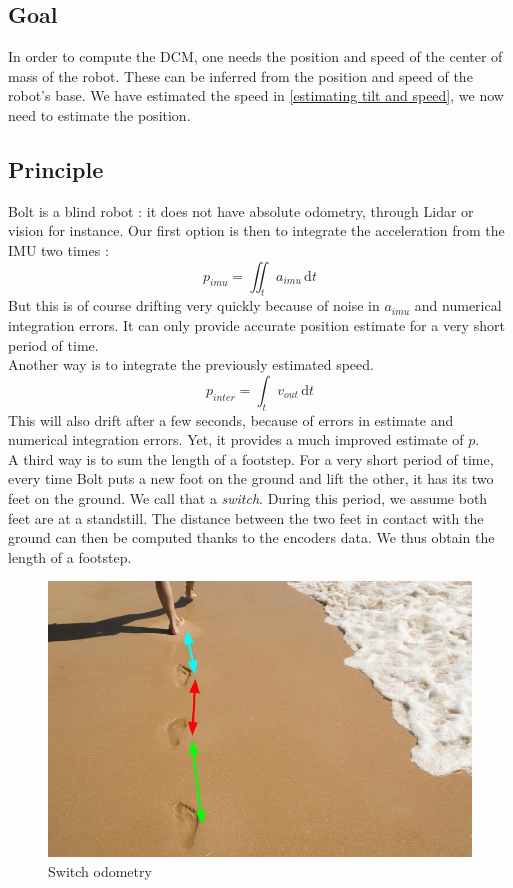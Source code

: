\documentclass[a4paper,10pt]{article}
\begin{document}
\subsection{Goal}
In order to compute the DCM, one needs the position and speed of the center of mass of the robot. These can be inferred from the position and speed of the robot's base. We have estimated the speed in \ref{estimating tilt and speed}, we now need to estimate the position.

\subsection{Principle}
Bolt is a blind robot : it does not have absolute odometry, through Lidar or vision for instance. Our first option is then to integrate the acceleration from the IMU two times :
$$ p_{imu} = \iint_t a_{imu} \, \mathrm{d}t $$
But this is of course drifting very quickly because of noise in $a_{imu}$ and numerical integration errors. It can only provide accurate position estimate for a very short period of time.\\
\newline
Another way is to integrate the previously estimated speed.
$$ p_{inter} = \int_t v_{out} \, \mathrm{d}t $$
This will also drift after a few seconds, because of errors in estimate and numerical integration errors. Yet, it provides a much improved estimate of $p$.\\
\newline
A third way is to sum the length of a footstep. For a very short period of time, every time Bolt puts a new foot on the ground and lift the other, it has its two feet on the ground. We call that a \textit{switch}. During this period, we assume both feet are at a standstill. The distance between the two feet in contact with the ground can then be computed thanks to the encoders data. We thus obtain the length of a footstep.

\begin{figure}[H]
\centering
  \includegraphics[width=\linewidth, angle=0, scale=0.6]{./images/footprint.jpg}
  \caption{Switch odometry}
\end{figure}
\end{document}
